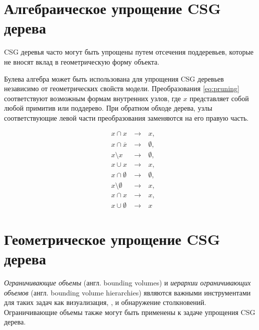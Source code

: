 \section{Алгебраическое упрощение CSG дерева} \label{sect_csg_tree_pruning}

CSG деревья часто могут быть упрощены путем отсечения поддеревьев, которые не вносят вклад в геометрическую форму объекта.

Булева алгебра может быть использована для упрощения CSG деревьев независимо от геометрических свойств модели. Преобразования \ref{eq:pruning} соответствуют возможным формам внутренних узлов, где $x$ представляет собой любой примитив или поддерево. При обратном обходе дерева, узлы соответствующие левой части преобразования заменяются на его правую часть.

\begin{equation}
  \label{eq:pruning}
  \begin{alignedat}{2}
    &x \cap x \  & \rightarrow \  &x, \\
    &x \cap \overline{x} \  & \rightarrow \  &\emptyset, \\
    &x \setminus x \  & \rightarrow \  &\emptyset, \\
    &x \cup x \  & \rightarrow \  &x, \\
    &x \cap \emptyset \  & \rightarrow \  &\emptyset, \\
    &x \setminus \emptyset \  & \rightarrow \  &x, \\
    &x \cap x \  & \rightarrow \  &x, \\
    &x \cup \emptyset \  & \rightarrow \  &x
  \end{alignedat}
\end{equation}

\section{Геометрическое упрощение CSG дерева} \label{sect_csg_bound_pruning}

\textit{Ограничивающие объемы} (англ. bounding volumes) и \textit{иерархии ограничивающих объемов} (англ. bounding volume hierarchies) являются важными инструментами для таких задач как визуализация\cite{clark1976hierarchical}, \cite{rubin19803}, \cite{weghorst1984improved} и обнаружение столкновений. Ограничивающие объемы также могут быть применены к задаче упрощения CSG дерева.

